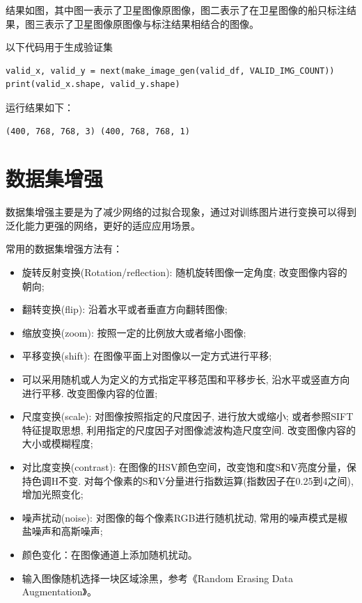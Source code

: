 结果如图，其中图一表示了卫星图像原图像，图二表示了在卫星图像的船只标注结果，图三表示了卫星图像原图像与标注结果相结合的图像。

以下代码用于生成验证集

\begin{verbatim}
valid_x, valid_y = next(make_image_gen(valid_df, VALID_IMG_COUNT))
print(valid_x.shape, valid_y.shape)
\end{verbatim}

运行结果如下：

\begin{verbatim}
(400, 768, 768, 3) (400, 768, 768, 1)
\end{verbatim}

\section{数据集增强}

数据集增强主要是为了减少网络的过拟合现象，通过对训练图片进行变换可以得到泛化能力更强的网络，更好的适应应用场景。

常用的数据集增强方法有：

\begin{itemize}
\tightlist
\item
  旋转\textbar{}反射变换(Rotation/reflection): 随机旋转图像一定角度;
  改变图像内容的朝向;
\item
  翻转变换(flip): 沿着水平或者垂直方向翻转图像;
\item
  缩放变换(zoom): 按照一定的比例放大或者缩小图像;
\item
  平移变换(shift): 在图像平面上对图像以一定方式进行平移;
\item
  可以采用随机或人为定义的方式指定平移范围和平移步长,
  沿水平或竖直方向进行平移. 改变图像内容的位置;
\item
  尺度变换(scale): 对图像按照指定的尺度因子, 进行放大或缩小;
  或者参照SIFT特征提取思想, 利用指定的尺度因子对图像滤波构造尺度空间.
  改变图像内容的大小或模糊程度;
\item
  对比度变换(contrast):
  在图像的HSV颜色空间，改变饱和度S和V亮度分量，保持色调H不变.
  对每个像素的S和V分量进行指数运算(指数因子在0.25到4之间), 增加光照变化;
\item
  噪声扰动(noise): 对图像的每个像素RGB进行随机扰动,
  常用的噪声模式是椒盐噪声和高斯噪声;
\item
  颜色变化：在图像通道上添加随机扰动。
\item
  输入图像随机选择一块区域涂黑，参考《Random Erasing Data
  Augmentation》。
\end{itemize}


